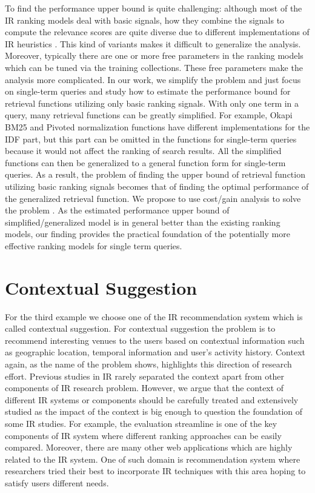 To find the performance upper bound is quite challenging: although most of 
the IR ranking models deal with basic signals, how they combine the signals 
to compute the relevance scores are quite diverse due to different 
implementations of IR heuristics \cite{Fang:2004:FSI:1008992.1009004}. 
This kind of variants makes it difficult to generalize the analysis. 
Moreover, typically there are one or more free parameters in the ranking 
models which can be tuned via the training collections. 
These free parameters make the analysis more complicated.
In our work, we simplify the problem and just focus on single-term queries 
and study how to estimate the performance bound for retrieval functions 
utilizing only basic ranking signals. 
With only one term in a query, many retrieval functions can be greatly 
simplified. For example, Okapi BM25 and Pivoted normalization functions have 
different implementations for the IDF part, but this part can be omitted in the 
functions for single-term queries because it would not affect the ranking of 
search results. All the simplified functions can then be generalized to a 
general function form for single-term queries. As a result, the problem of 
finding the upper bound of retrieval function utilizing basic ranking signals 
becomes that of finding the optimal performance of the generalized retrieval 
function. We propose to use cost/gain analysis to solve the problem \cite{export:132652,export:68133,export:81144}. 
As the estimated performance upper bound of simplified/generalized model is 
in general better than the existing ranking models, our finding provides the 
practical foundation of the potentially more effective ranking models for 
single term queries.

\section{Contextual Suggestion}
For the third example we choose one of the IR recommendation system which is 
called contextual suggestion. For contextual suggestion the problem is to 
recommend interesting venues to the users based on contextual information 
such as geographic location, temporal information and user's activity history. 
Context again, as the name of the problem shows, highlights this direction 
of research effort. 
Previous studies in IR rarely separated the context apart from other 
components of IR research problem. However, we argue that the context of 
different IR systems or components should be carefully treated and extensively 
studied as the impact of the context is big enough to question the foundation 
of some IR studies.
For example, the evaluation streamline is one of the key 
components of IR system where different ranking approaches can be 
easily compared. Moreover, there are many other web applications which 
are highly related to the IR system. One of such domain is recommendation 
system where researchers tried their best to incorporate IR techniques 
with this area hoping to satisfy users different needs.

